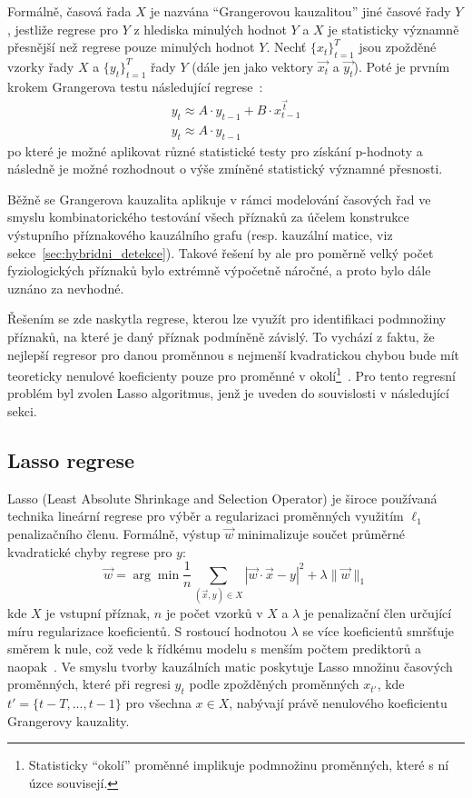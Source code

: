 Formálně, časová řada $X$ je nazvána \enquote{Grangerovou kauzalitou} jiné
časové řady $Y$, jestliže regrese pro $Y$ z hlediska minulých hodnot $Y$ a $X$
je statisticky významně přesnější než regrese pouze minulých hodnot $Y$. Nechť
$\{x_t\}_{t=1}^T$ jsou zpožděné vzorky řady $X$ a $\{y_t\}_{t=1}^T$
řady $Y$ (dále jen jako vektory $\overrightarrow{x_t}$ a $\overrightarrow{y_t}$).
Poté je prvním krokem Grangerova testu následující regrese~\cite{Arnold2007}:
\begin{equation}
    \begin{gathered}
        y_t \approx A \cdot y_{t-1}+B \cdot x_{t-1}^{\vec{t}} \\
        y_t \approx A \cdot y_{t-1}
    \end{gathered}
\end{equation}
po které je možné aplikovat různé statistické testy pro získání p-hodnoty a
následně je možné rozhodnout o výše zmíněné statistický významné přesnosti.

Běžně se Grangerova kauzalita aplikuje v rámci modelování časových řad ve smyslu
kombinatorického testování všech příznaků za účelem konstrukce výstupního
příznakového kauzálního grafu (resp. kauzální matice, viz
sekce~\ref{sec:hybridni_detekce}). Takové řešení by ale pro poměrně velký počet
fyziologických příznaků bylo extrémně výpočetně náročné, a proto bylo dále
uznáno za nevhodné.

Řešením se zde naskytla regrese, kterou lze využít pro identifikaci podmnožiny
příznaků, na které je daný příznak podmíněně závislý. To vychází z faktu, že
nejlepší regresor pro danou proměnnou s nejmenší kvadratickou chybou bude mít
teoreticky nenulové koeficienty pouze pro proměnné v okolí\footnote{Statisticky
    \enquote{okolí} proměnné implikuje podmnožinu proměnných, které s ní úzce
    souvisejí.}~\cite{Schindler2013,Arnold2007}. Pro tento regresní problém byl
zvolen Lasso algoritmus, jenž je uveden do souvislosti v následující sekci.

\subsection{Lasso regrese}
\label{subsec:lasso}
Lasso (Least Absolute Shrinkage and Selection Operator) je široce
používaná technika lineární regrese pro výběr a regularizaci proměnných využitím
$\ell_1$ penalizačního členu. Formálně, výstup $\vec{w}$ minimalizuje součet
průměrné kvadratické chyby regrese pro $y$:
\begin{equation}
    \vec{w}=\arg \min \frac{1}{n} \sum_{(\vec{x}, y) \in X}|\vec{w} \cdot \vec{x}-y|^2+\lambda\|\vec{w}\|_1
\end{equation}
kde $X$ je vstupní příznak, $n$ je počet vzorků v $X$ a $\lambda$ je penalizační
člen určující míru regularizace koeficientů. S rostoucí hodnotou $\lambda$ se
více koeficientů smršťuje směrem k nule, což vede k řídkému modelu s menším
počtem prediktorů a naopak~\cite{Tibshirani1996}. Ve smyslu tvorby kauzálních
matic poskytuje Lasso množinu časových proměnných, které při regresi $y_t$ podle
zpožděných proměnných $x_{t'}$, kde $t'=\{t-T,...,t -1\}$ pro všechna $x \in X$,
nabývají právě nenulového koeficientu Grangerovy kauzality.

